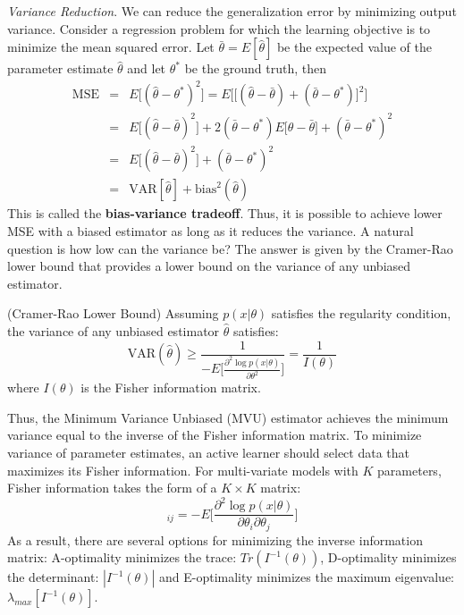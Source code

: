 \textit{Variance Reduction}. We can reduce the generalization error by minimizing output variance. Consider a regression problem for which the learning objective is to minimize the mean squared error. Let $\bar{\theta} = E[\hat{\theta}]$ be the expected value of the parameter estimate $\hat{\theta}$ and let $\theta^{\ast}$ be the ground truth, then
\begin{eqnarray}
   \mathrm{MSE} &=& E\bigg[(\hat{\theta} - \theta^{\ast})^{2} \bigg]  = E\bigg[\big[(\hat{\theta} - \bar{\theta})+(\bar{\theta} - \theta^{\ast}) \big]^{2} \bigg] \\
                &=& E\bigg[(\hat{\theta} - \bar{\theta})^{2} \bigg] + 2(\bar{\theta}-\theta^{\ast})E\bigg[\hat{\theta}-\bar{\theta}\bigg] + (\bar{\theta}-\theta^{\ast})^{2} \\
                &=& E\bigg[(\hat{\theta} - \bar{\theta})^{2} \bigg] +  (\bar{\theta}-\theta^{\ast})^{2} \\
                &=& \mathrm{VAR}[\hat{\theta}] + \mathrm{bias}^{2}(\hat{\theta})
\end{eqnarray}
This is called the \textbf{bias-variance tradeoff}. Thus, it is possible to achieve lower MSE with a biased estimator as long as it reduces the variance. A natural question is how low can the variance be? The answer is given by the Cramer-Rao lower bound that provides a lower bound on the variance of any unbiased estimator.
\begin{theorem}
(Cramer-Rao Lower Bound) Assuming $p(x|\theta)$ satisfies the regularity condition, the variance of any unbiased estimator $\hat{\theta}$ satisfies:
\begin{equation}
    \mathrm{VAR}(\hat{\theta}) \geq \frac{1}{-E\big[\frac{\partial^{2} \log p(x|\theta)}{\partial \theta^{2}} \big]} = \frac{1}{I(\theta)}
\end{equation}
where $I(\theta)$ is the Fisher information matrix. 
\end{theorem}
Thus, the Minimum Variance Unbiased (MVU) estimator achieves the minimum variance equal to the inverse of the Fisher information matrix. To minimize variance of parameter estimates, an active learner should select data that maximizes its Fisher information. For multi-variate models with $K$ parameters, Fisher information takes the form of a $K\times K$ matrix:
\begin{equation}
    [I(\theta)]_{ij} = -E \bigg[\frac{\partial^{2}\log p(x|\theta)}{\partial \theta_i \partial \theta_j} \bigg]
\end{equation}
As a result, there are several options for minimizing the inverse information matrix: A-optimality minimizes the trace: $Tr(I^{-1}(\theta))$, D-optimality minimizes the determinant: $|I^{-1}(\theta)|$ and E-optimality minimizes the maximum eigenvalue: $\lambda_{max}[I^{-1}(\theta)]$.\\

